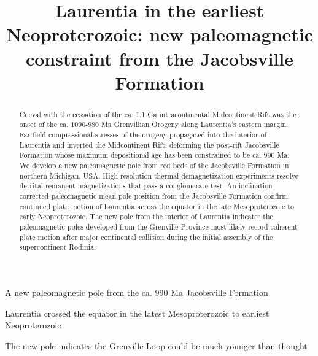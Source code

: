 \documentclass[draft]{agujournal2019}
\begin{document}
\title{Laurentia in the earliest Neoproterozoic: new paleomagnetic constraint from the Jacobsville Formation}




\begin{keypoints}
\item A new paleomagnetic pole from the ca. 990 Ma Jacobsville Formation \item Laurentia crossed the equator in the latest Mesoproterozoic to earliest Neoproterozoic
\item The new pole indicates the Grenville Loop could be much younger than thought
\end{keypoints}


\begin{abstract}
Coeval with the cessation of the ca. 1.1 Ga intracontinental Midcontinent Rift was the onset of the ca. 1090-980 Ma Grenvillian Orogeny along Laurentia's eastern margin. Far-field compressional stresses of the orogeny propagated into the interior of Laurentia and inverted the Midcontinent Rift, deforming the post-rift Jacobsville Formation whose maximum depositional age has been constrained to be ca. 990 Ma. We develop a new paleomagnetic pole from red beds of the Jacobsville Formation in northern Michigan, USA. High-resolution thermal demagnetization experiments resolve detrital remanent magnetizations that pass a conglomerate test. An inclination corrected paleomagnetic mean pole position from the Jacobsville Formation confirm continued plate motion of Laurentia across the equator in the late Mesoproterozoic to early Neoproterozoic. The new pole from the interior of Laurentia indicates the paleomagnetic poles developed from the Grenville Province most likely record coherent plate motion after major continental collision during the initial assembly of the supercontinent Rodinia.
\end{abstract}

\end{document}
